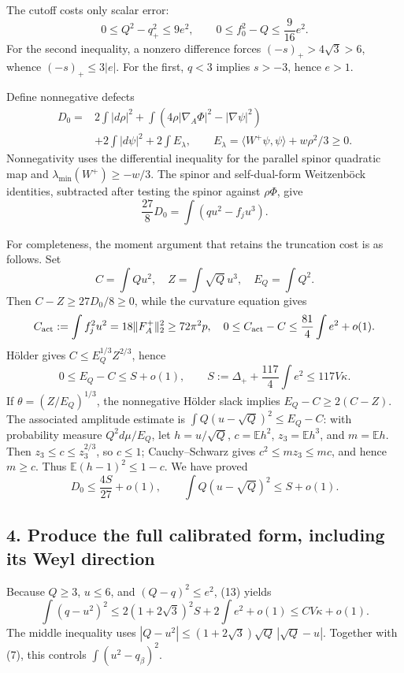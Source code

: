\documentclass[
  11pt,
]{article}
\begin{document}
The cutoff costs only scalar error: \[
0\le Q^2-q_+^2\le9e^2,\qquad
0\le f_0^2-Q\le\frac9{16}e^2.
\tag{10}
\] For the second inequality, a nonzero difference forces
\((-s)_+>4\sqrt3>6\), whence \((-s)_+\le3|e|\). For the first, \(q<3\)
implies \(s>-3\), hence \(e>1\).

Define nonnegative defects \[
\begin{split}
D_0={}&2\int|d\rho|^2
+\int(4\rho|\nabla_A\Phi|^2-|\nabla\psi|^2)\\
&+2\int|d\psi|^2+2\int E_\lambda,\qquad
E_\lambda=\langle W^+\psi,\psi\rangle+w\rho^2/3\ge0.
\end{split}
\tag{11}
\] Nonnegativity uses the differential inequality for the parallel
spinor quadratic map and \(\lambda_{\min}(W^+)\ge-w/3\). The spinor and
self-dual-form Weitzenböck identities, subtracted after testing the
spinor against \(\rho\Phi\), give \[
\frac{27}{8}D_0=\int(qu^2-f_j u^3).
\tag{12}
\]

For completeness, the moment argument that retains the truncation cost
is as follows. Set \[
C=\int Qu^2,\quad Z=\int\sqrt Q\,u^3,\quad E_Q=\int Q^2.
\] Then \(C-Z\ge27D_0/8\ge0\), while the curvature equation gives \[
C_{\rm act}:=\int f_j^2u^2=18\|F_A^+\|_2^2\ge72\pi^2p,
\quad 0\le C_{\rm act}-C\le\frac{81}{4}\int e^2+o(1).
\] Hölder gives \(C\le E_Q^{1/3}Z^{2/3}\), hence \[
0\le E_Q-C\le S+o(1),\qquad
S:=\Delta_++\frac{117}{4}\int e^2\le117V\kappa.
\] If \(\theta=(Z/E_Q)^{1/3}\), the nonnegative Hölder slack implies
\(E_Q-C\ge2(C-Z)\). The associated amplitude estimate is
\(\int Q(u-\sqrt Q)^2\le E_Q-C\): with probability measure
\(Q^2d\mu/E_Q\), let \(h=u/\sqrt Q\), \(c=\mathbb E h^2\),
\(z_3=\mathbb E h^3\), and \(m=\mathbb E h\). Then
\(z_3\le c\le z_3^{2/3}\), so \(c\le1\); Cauchy--Schwarz gives
\(c^2\le m z_3\le mc\), and hence \(m\ge c\). Thus
\(\mathbb E(h-1)^2\le1-c\). We have proved \[
D_0\le\frac{4S}{27}+o(1),\qquad
\int Q(u-\sqrt Q)^2\le S+o(1).
\tag{13}
\]

\hypertarget{produce-the-full-calibrated-form-including-its-weyl-direction}{%
\subsection{4. Produce the full calibrated form, including its Weyl
direction}\label{produce-the-full-calibrated-form-including-its-weyl-direction}}

Because \(Q\ge3\), \(u\le6\), and \((Q-q)^2\le e^2\), (13) yields \[
\int(q-u^2)^2
\le2(1+2\sqrt3)^2S+2\int e^2+o(1)
\le C V\kappa+o(1).
\tag{14}
\] The middle inequality uses
\(|Q-u^2|\le(1+2\sqrt3)\sqrt Q\,|\sqrt Q-u|\). Together with (7), this
controls \(\int(u^2-q_\beta)^2\).
\end{document}
